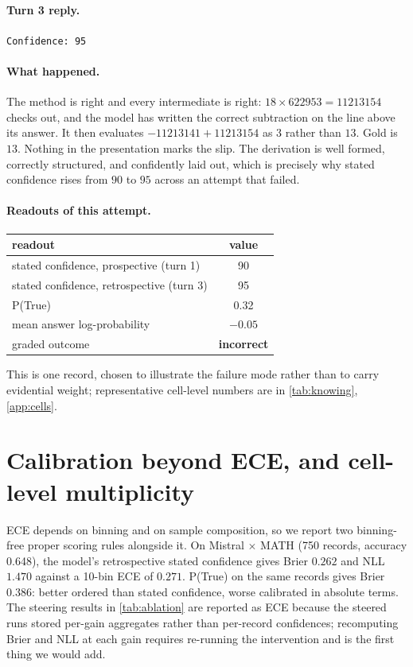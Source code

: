 \paragraph{Turn 3 reply.} \texttt{Confidence: 95}

\paragraph{What happened.}
The method is right and every intermediate is right: $18 \times 622953 = 11213154$ checks out,
and the model has written the correct subtraction on the line above its answer.
It then evaluates $-11213141 + 11213154$ as $3$ rather than $13$. Gold is $13$.
Nothing in the presentation marks the slip. The derivation is well formed, correctly
structured, and confidently laid out, which is precisely why stated confidence rises
from $90$ to $95$ across an attempt that failed.

\paragraph{Readouts of this attempt.}
\begin{center}
\small
\begin{tabular}{lc}
\toprule
\textbf{readout} & \textbf{value} \\
\midrule
stated confidence, prospective (turn 1) & 90 \\
stated confidence, retrospective (turn 3) & 95 \\
P(True) & 0.32 \\
mean answer log-probability & $-0.05$ \\
\midrule
graded outcome & \textbf{incorrect} \\
\bottomrule
\end{tabular}
\end{center}

\noindent
This is one record, chosen to illustrate the failure mode rather than to carry evidential
weight; representative cell-level numbers are in \cref{tab:knowing}, \cref{app:cells}.

\section{Calibration beyond ECE, and cell-level multiplicity}
\label{app:stats}

ECE depends on binning and on sample composition, so we report two binning-free proper
scoring rules alongside it. On Mistral $\times$ MATH (750 records, accuracy 0.648), the
model's retrospective stated confidence gives Brier $0.262$ and NLL $1.470$ against a
10-bin ECE of $0.271$. P(True) on the same records gives Brier $0.386$: better ordered
than stated confidence, worse calibrated in absolute terms. The steering results in
\cref{tab:ablation} are reported as ECE because the steered runs stored per-gain
aggregates rather than per-record confidences; recomputing Brier and NLL at each gain
requires re-running the intervention and is the first thing we would add.

